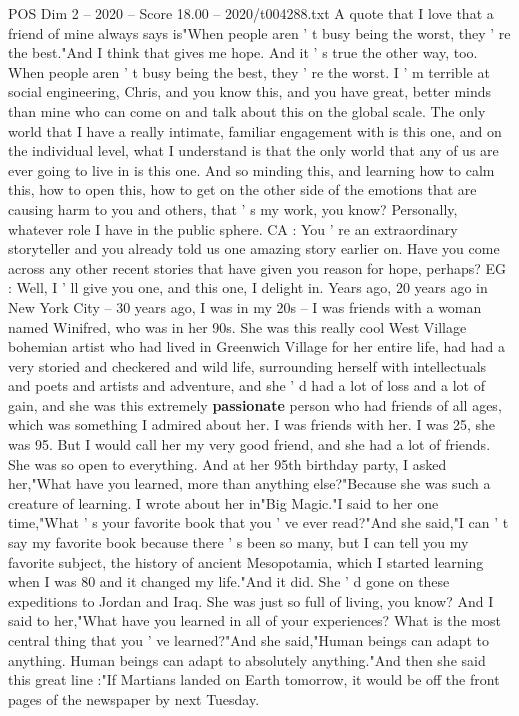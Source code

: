 \begin{textsample}{POS Dim 2 – 2020 – Score 18.00 – 2020/t004288.txt}
A quote that I love that a friend of mine always says is"When people aren ' t busy being the worst, they ' re the best."And I think that gives me hope.
And it ' s true the other way, too.
When people aren ' t busy being the best, they ' re the worst.
I ' m terrible at social engineering, Chris, and you know this, and you have great, better minds than mine who can come on and talk about this on the global scale.
The only world that I have a really intimate, familiar engagement with is this one, and on the individual level, what I understand is that the only world that any of us are ever going to live in is this one.
And so minding this, and learning how to calm this, how to open this, how to get on the other side of the emotions that are causing harm to you and others, that ' s my work, you know?
Personally, whatever role I have in the public sphere.
CA : You ' re an extraordinary storyteller and you already told us one amazing story earlier on.
Have you come across any other recent stories that have given you reason for hope, perhaps?
EG : Well, I ' ll give you one, and this one, I delight in.
Years ago, 20 years ago in New York City -- 30 years ago, I was in my 20s -- I was friends with a woman named Winifred, who was in her 90s.
She was this really cool West Village bohemian artist who had lived in Greenwich Village for her entire life, had had a very storied and checkered and wild life, surrounding herself with intellectuals and poets and artists and adventure, and she ' d had a lot of loss and a lot of gain, and she was this extremely \textbf{passionate} person who had friends of all ages, which was something I admired about her.
I was friends with her.
I was 25, she was 95.
But I would call her my very good friend, and she had a lot of friends.
She was so open to everything.
And at her 95th birthday party, I asked her,"What have you learned, more than anything else?"Because she was such a creature of learning.
I wrote about her in"Big Magic."I said to her one time,"What ' s your favorite book that you ' ve ever read?"And she said,"I can ' t say my favorite book because there ' s been so many, but I can tell you my favorite subject, the history of ancient Mesopotamia, which I started learning when I was 80 and it changed my life."And it did.
She ' d gone on these expeditions to Jordan and Iraq.
She was just so full of living, you know?
And I said to her,"What have you learned in all of your experiences?
What is the most central thing that you ' ve learned?"And she said,"Human beings can adapt to anything.
Human beings can adapt to absolutely anything."And then she said this great line :"If Martians landed on Earth tomorrow, it would be off the front pages of the newspaper by next Tuesday.

\end{textsample}
